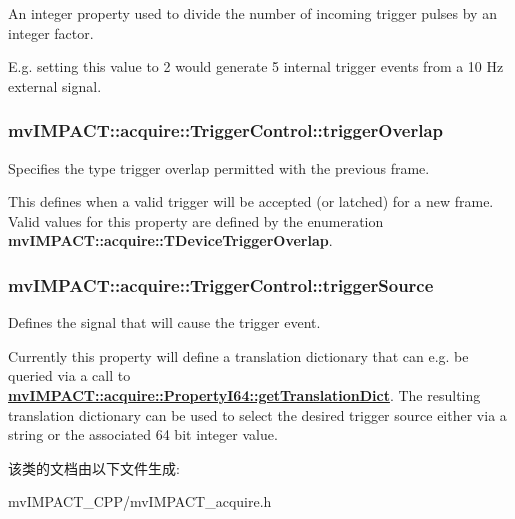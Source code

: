 An integer property used to divide the number of incoming trigger pulses by an integer factor. 

E.\+g. setting this value to 2 would generate 5 internal trigger events from a 10 Hz external signal. \hypertarget{classmv_i_m_p_a_c_t_1_1acquire_1_1_trigger_control_a14e6151f6e6f0b3da896e0bfc0226855}{
\subsubsection[{trigger\+Overlap}]{ mv\+I\+M\+P\+A\+C\+T\+::acquire\+::\+Trigger\+Control\+::trigger\+Overlap}}\label{classmv_i_m_p_a_c_t_1_1acquire_1_1_trigger_control_a14e6151f6e6f0b3da896e0bfc0226855}


Specifies the type trigger overlap permitted with the previous frame. 

This defines when a valid trigger will be accepted (or latched) for a new frame. Valid values for this property are defined by the enumeration {\bfseries mv\+I\+M\+P\+A\+C\+T\+::acquire\+::\+T\+Device\+Trigger\+Overlap}. \hypertarget{classmv_i_m_p_a_c_t_1_1acquire_1_1_trigger_control_ad931c24fbfb7e09ab087387927f3caea}{
\subsubsection[{trigger\+Source}]{ mv\+I\+M\+P\+A\+C\+T\+::acquire\+::\+Trigger\+Control\+::trigger\+Source}}\label{classmv_i_m_p_a_c_t_1_1acquire_1_1_trigger_control_ad931c24fbfb7e09ab087387927f3caea}


Defines the signal that will cause the trigger event. 

Currently this property will define a translation dictionary that can e.\+g. be queried via a call to {\bfseries \hyperlink{classmv_i_m_p_a_c_t_1_1acquire_1_1_enum_property_i64_a44a7cd1ee2000d169e39f4e5b130a410}{mv\+I\+M\+P\+A\+C\+T\+::acquire\+::\+Property\+I64\+::get\+Translation\+Dict}}. The resulting translation dictionary can be used to select the desired trigger source either via a string or the associated 64 bit integer value. 

该类的文档由以下文件生成\+:\begin{DoxyCompactItemize}
\item 
mv\+I\+M\+P\+A\+C\+T\+\_\+\+C\+P\+P/mv\+I\+M\+P\+A\+C\+T\+\_\+acquire.\+h\end{DoxyCompactItemize}
